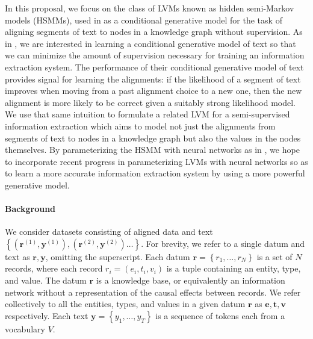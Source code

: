 \documentclass[12pt]{article}
\newcommand\set[1]{\left\{#1\right\}}
\newcommand{\be}{\mathbf{e}}
\newcommand{\br}{\mathbf{r}}
\newcommand{\bt}{\mathbf{t}}
\newcommand{\bv}{\mathbf{v}}
\newcommand{\by}{\mathbf{y}}
\begin{document}
In this proposal, we focus on the class of LVMs known as hidden semi-Markov models (HSMMs),
used in \citet{liang2009semalign} as a conditional generative model for the
task of aligning segments of text to
nodes in a knowledge graph without supervision.
As in \citet{liang2009semalign}, we are interested in learning a conditional generative model of text so that
we can minimize the amount of supervision necessary for training an information extraction system.
The performance of their conditional generative model of text provides signal for learning the alignments:
if the likelihood of a segment of text improves when moving from a
past alignment choice to a new one,
then the new alignment is more likely to be correct given a suitably strong likelihood model.
We use that same intuition to formulate a related LVM for a semi-supervised information extraction
which aims to model not just the alignments from segments of text to nodes in a knowledge graph
but also the values in the nodes themselves.
By parameterizing the HSMM with neural networks as in \citet{wiseman2018template},
we hope to incorporate recent progress in parameterizing LVMs with neural networks
so as to learn a more accurate information extraction system by using a more powerful
generative model.

\paragraph{Background}
We consider datasets consisting of aligned data and text
$\set{(\br^{(1)}, \by^{(1)}),(\br^{(2)},\by^{(2)})\ldots}$.
For brevity, we refer to a single datum and text as $\br,\by$, omitting the superscript.
Each datum $\br = \set{r_1,\ldots,r_N}$ is a set of $N$ records, where each record $r_i = (e_i, t_i, v_i)$
is a tuple containing an entity, type, and value.
The datum $\br$ is a knowledge base, or equivalently an information network
without a representation of the causal effects between records.
We refer collectively to all the entities, types, and values in a given datum $\br$ as
$\be,\bt,\bv$ respectively.
Each text $\by = \set{y_1,\ldots,y_T}$ is a sequence of tokens each from a vocabulary $V$.
\end{document}
